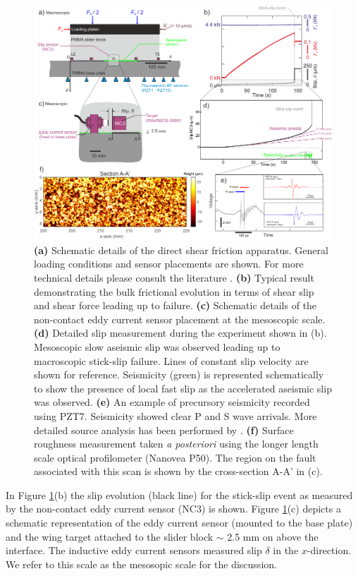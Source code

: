 \documentclass[preprint,1p, 10pt,authoryear]{elsarticle}
\begin{document}
\begin{figure}
 	\centering
 	\includegraphics{FIG1.pdf} 
 	\caption{ \textbf{(a)} Schematic details of the direct shear friction apparatus. General loading conditions and sensor placements are shown. For more technical details please consult the literature \citep{Selvadurai2015, Selvadurai2015a}. \textbf{(b)} Typical result demonstrating the bulk frictional evolution in terms of shear slip and shear force leading up to failure. \textbf{(c)} Schematic details of the non-contact eddy current sensor placement at the mesoscopic scale. \textbf{(d)} Detailed slip measurement during the experiment shown in (b).  Mesoscopic slow aseismic slip was observed leading up to macroscopic stick-slip failure.  Lines of constant slip velocity are shown for reference.  Seismicity (green) is represented schematically to show the presence of local fast slip as the accelerated aseismic slip was observed. \textbf{(e)}  An example of precursory seismicity recorded using PZT7.  Seismicity showed clear P and S wave arrivals. More detailed source analysis has been performed by \citet{Selvadurai2019}. \textbf{(f)} Surface roughness measurement taken \textit{a posteriori} using the longer length scale optical profilometer (Nanovea P50).  The region on the fault associated with this scan is shown by the cross-section A-A’ in (c).}
 	\label{fig1}
 \end{figure}
 In Figure \ref{fig1}(b) the slip evolution (black line) for the stick-slip event as measured by the non-contact eddy current sensor (NC3) is shown.  Figure \ref{fig1}(c) depicts a schematic representation of the eddy current sensor (mounted to the base plate) and the wing target attached to the slider block $\sim$ 2.5 mm on above the interface.  The inductive eddy current sensors measured slip $\delta$ in the $x$-direction. We refer to this scale as the mesosopic scale for the discussion.   
 
\end{document}
